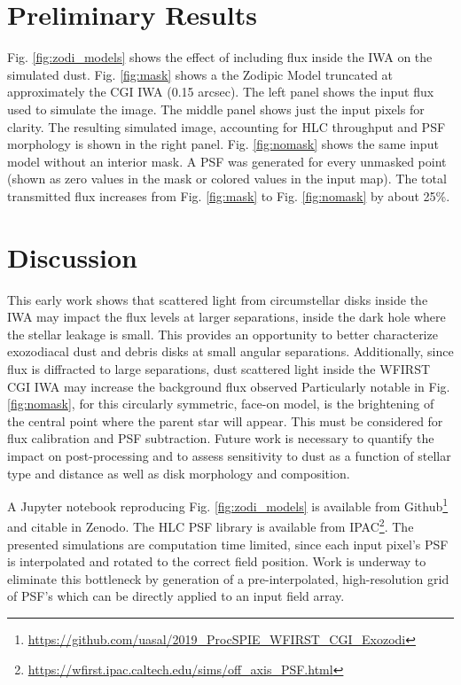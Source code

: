 \documentclass[]{spie}  %
\begin{document}
\section{Preliminary Results}

    Fig. \ref{fig:zodi_models} shows the effect of including flux inside the \gls{IWA} on the simulated dust.
    Fig. \ref{fig:mask} shows a the Zodipic Model truncated at approximately the \gls{CGI} \gls{IWA} (0.15 arcsec). The left panel shows the input flux used to simulate the image. The middle panel shows just the input pixels for clarity. 
    The resulting simulated image, accounting for \gls{HLC} throughput and \gls{PSF} morphology is shown in the right panel.
    Fig. \ref{fig:nomask} shows the same input model without an interior mask.
    A \gls{PSF} was generated for every unmasked point (shown as zero values in the mask or colored values in the input map).    The  total transmitted flux increases from Fig. \ref{fig:mask} to Fig. \ref{fig:nomask} by about 25\%.
    
    \section{Discussion}
    This early work shows that scattered light from circumstellar disks inside the \gls{IWA} may impact the flux levels at larger separations, inside the dark hole where the stellar leakage is small.
    This provides an opportunity to better characterize exozodiacal dust and debris disks at small angular separations.
    Additionally, since flux is diffracted to large separations, dust scattered light inside the \gls{WFIRST} CGI \gls{IWA} may increase the background flux observed
    Particularly notable in Fig. \ref{fig:nomask}, for this circularly symmetric, face-on model,  is the brightening of the central point where the parent star will appear. This must be considered  for flux calibration and \gls{PSF} subtraction.
    Future work is necessary to quantify the impact on post-processing and to assess sensitivity to dust as a function of stellar type and distance as well as disk morphology and composition.
    
    A Jupyter notebook reproducing Fig. \ref{fig:zodi_models} is available from Github\footnote{\url{https://github.com/uasal/2019_ProcSPIE_WFIRST_CGI_Exozodi}} and citable in Zenodo\cite{douglas_douglase/2019_procspie_wfirst_cgi_exozodi_2019}. 
    The HLC PSF library is available from IPAC\footnote{\url{https://wfirst.ipac.caltech.edu/sims/off_axis_PSF.html}}.
        The presented simulations are computation time limited, since each input pixel's PSF is interpolated and rotated to the correct field position. 
        Work is underway to eliminate this bottleneck by generation of a pre-interpolated, high-resolution grid of PSF's which can be directly applied to an input field array.
\end{document}

